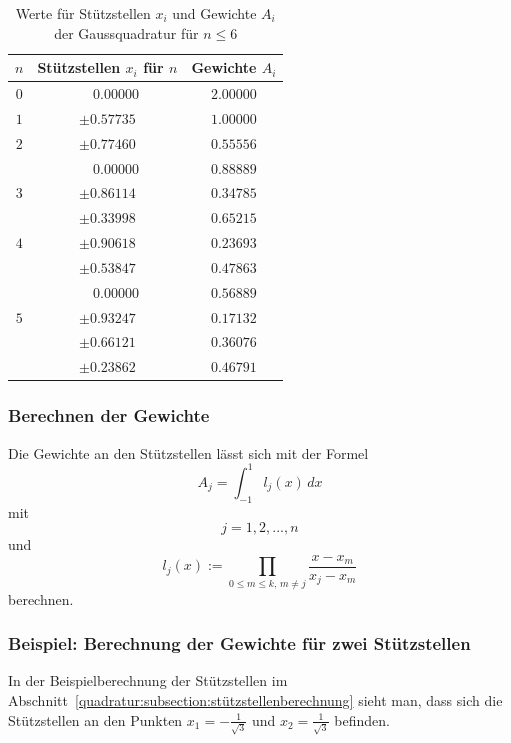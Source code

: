 \begin{table}
    \centering
    \begin{tabular}{|c|c|c|}
        \hline
        $n$ & Stützstellen $x_{i}$ für $n$ & Gewichte $A_{i}$\\
        \hline
        $0$ & $ \phantom{-} 0.00000 $ & $ 2.00000 $ \\
        \hline
        $1$ & $ \pm 0.57735 $ & $ 1.00000 $ \\
        \hline
        $2$ & $ \pm 0.77460 $ & $ 0.55556 $ \\
            & $ \phantom{-} 0.00000 $ & $ 0.88889 $ \\
        \hline
        $3$ & $ \pm 0.86114 $ & $ 0.34785 $ \\
            & $ \pm 0.33998 $ & $ 0.65215 $ \\
        \hline
        $4$ & $ \pm 0.90618 $ & $ 0.23693 $ \\
            & $ \pm 0.53847 $ & $ 0.47863 $ \\
            & $ \phantom{-} 0.00000 $ & $ 0.56889 $ \\
        \hline
        $5$ & $ \pm 0.93247 $ & $ 0.17132 $ \\
            & $ \pm 0.66121 $ & $ 0.36076 $ \\
            & $ \pm 0.23862 $ & $ 0.46791 $ \\
        \hline
    \end{tabular}
    \caption{Werte für Stützstellen $x_{i}$ und Gewichte $A_{i}$ der Gaussquadratur für $n \leq 6$
    \label{buch:table:gaussgewichtwerte}}    
\end{table}

\subsubsection{Berechnen der Gewichte}
Die Gewichte an den Stützstellen lässt sich mit der Formel
\begin{equation*}
    A_{j} = \int_{-1}^{1} l_j(x) \, dx
\end{equation*}
mit
\begin{equation*}
    j = 1, 2, ... , n
\end{equation*}
und 
\begin{equation}
    l_{j}(x) := \prod_{0 \leq m \leq k, \, m \neq j} \frac{x - x_{m}}{x_{j} - x_{m}}
\end{equation}
berechnen.

\subsubsection{Beispiel: Berechnung der Gewichte für zwei Stützstellen}
In der Beispielberechnung der Stützstellen im
Abschnitt~\ref{quadratur:subsection:stützstellenberechnung} sieht man, dass sich die 
Stützstellen an den Punkten $x_{1} = -\frac{1}{\sqrt{3}} $ und $x_{2} = \frac{1}{\sqrt{3}} $ befinden.


